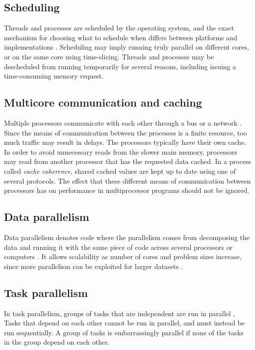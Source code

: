 \subsection{Scheduling}
Threads and processes are scheduled by the operating system, and the exact mechanism for choosing what to schedule when differs
between platforms and implementations \cite[p. 472]{herlihy_2012_art_taomprr}. Scheduling may imply running truly parallel
on different cores, or on the same core using time-slicing. Threads and processes may be descheduled from running temporarily for several
reasons, including issuing a time-consuming memory request.

\subsection{Multicore communication and caching}
Multiple processors communicate with each other through a bus or a network \cite[p. 472-476]{herlihy_2012_art_taomprr}. Since the
means of communication between the processes is a finite resource, too much traffic may result in delays. The processors typically
have their own cache. In order to avoid unnecessary reads from the slower main memory, processors may read from another processor
that has the requested data cached. In a process called \emph{cache coherence}, shared cached values are kept up to date using one
of several protocols. The effect that these different means of communication between processors has on performance in
multiprocessor programs should not be ignored.

\subsection{Data parallelism}
Data parallelism denotes code where the parallelism comes from decomposing the data and running it with the same piece of code
across several processors or computers \cite{singh_2013_parallel_padpwprfmm}. It allows scalability as number of cores and problem
sizes increase, since more parallelism can be exploited for larger datasets \cite[p. 24]{mccool_2012_structured_spppfec}.

\subsection{Task parallelism}
In task parallelism, groups of tasks that are independent are run in parallel \cite{chow_2015_pipeline_ppiaote}.
Tasks that depend on each other cannot be run in parallel, and must instead be run sequentially.
A group of tasks is embarrassingly parallel if none of the tasks in the group depend on each other.

